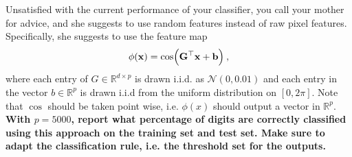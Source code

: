 \documentclass[11pt]{article}
\begin{document}
\begin{Parts}
\Part Unsatisfied with the current performance of your classifier, you call your mother for advice, and she suggests to use random features instead of raw pixel features. Specifically, she suggests to use the feature map
\begin{equation*}
\phi(\boldsymbol{\mathbf{x}}) = \cos(\mathbf{G}^\top \boldsymbol{\mathbf{x}} + \boldsymbol{\mathbf{b}})\:,
\end{equation*}
where each entry of $G\in \mathbb{R}^{d \times p}$ is drawn i.i.d. as $\mathcal{N}(0,0.01)$ and each entry in the vector $b\in \mathbb{R}^p$ is drawn i.i.d from the uniform distribution on $[0, 2\pi]$. Note that $\cos$ should be taken point wise, i.e. $\phi(x)$ should output a vector in $\mathbb{R}^p$.
\textbf{With $p=5000$, report what percentage of digits
are correctly classified using this approach on the training set and test set. Make sure to adapt the classification rule, i.e. the threshold set for the outputs.}



\end{Parts}
\end{document}

